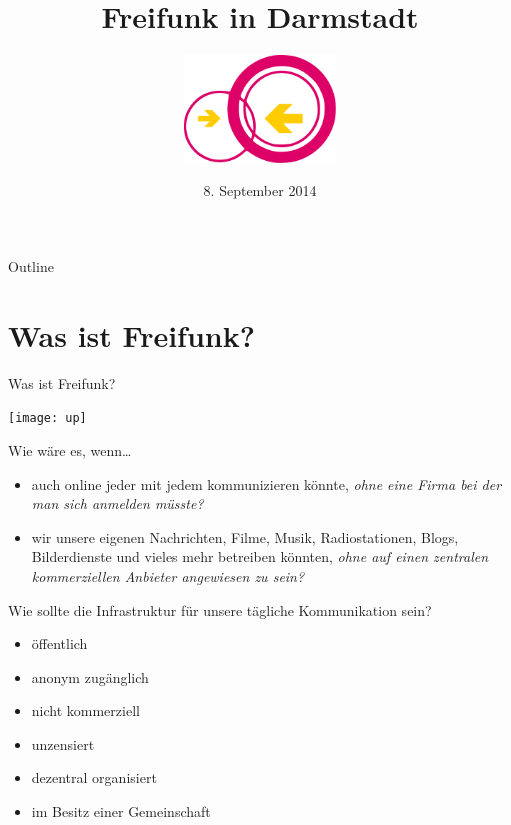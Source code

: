 \documentclass{beamer}
\title{Freifunk in Darmstadt}
\author{\includegraphics[width=4cm]{logo}}
\date{8. September 2014}
\begin{document}
\begin{frame}
\maketitle
\end{frame}


\begin{frame}{Outline}
\tableofcontents
\end{frame}

\section{Was ist Freifunk?}
\begin{frame}{Was ist Freifunk?}
\vfill
\begin{center}
\texttt{[image: up]}
\end{center}
\vfill
Wie wäre es, wenn\ldots
\vfill
\begin{itemize}
\pause\item auch online jeder mit jedem kommunizieren könnte\pause , \textit{ohne eine Firma bei der man sich anmelden müsste?}
\vfill
\pause\item wir unsere eigenen Nachrichten, Filme, Musik, Radiostationen, Blogs, Bilderdienste und vieles mehr betreiben könnten\pause ,  \textit{ohne auf einen zentralen kommerziellen Anbieter angewiesen zu sein?}
\end{itemize}
\end{frame}




\begin{frame}{Wie sollte die Infrastruktur für unsere tägliche Kommunikation sein?}
\vfill
\begin{itemize}
\pause\item öffentlich
\pause\item anonym zugänglich
\pause\item nicht kommerziell
\pause\item unzensiert
\pause\item dezentral organisiert
\pause\item im Besitz einer Gemeinschaft
\end{itemize}
\vfill
\end{frame}
\end{document}
